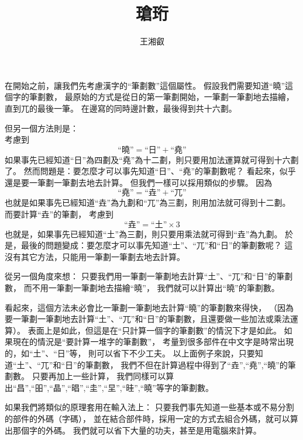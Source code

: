 \documentclass{article}
\title{瑲珩}
\author{王湘叡}
\begin{document}
\maketitle{}

在開始之前，讓我們先考慮漢字的``筆劃數''這個屬性。%
假設我們需要知道``曉''這個字的筆劃數，%
最原始的方式是從日的第一筆劃開始，一筆劃一筆劃地去描繪，直到兀的最後一筆。%
在邊寫的同時邊計數，最後得到共十六劃。%

但另一個方法則是：\\
考慮到\\
\[
  \mbox{``曉''}=\mbox{``日''}+\mbox{``堯''}
\]
如果事先已經知道``日''為四劃及``堯''為十二劃，則只要用加法運算就可得到十六劃了。%
然而問題是：要怎麼才可以事先知道``日''、``堯''的筆劃數呢？%
看起來，似乎還是要一筆劃一筆劃去地去計算。
但我們一樣可以採用類似的步驟。
因為\\
\[
  \mbox{``堯''}=\mbox{``垚''}+\mbox{``兀''}
\]
也就是如果事先已經知道``垚''為九劃和``兀''為三劃，則用加法就可得到十二劃。
而要計算``垚''的筆劃，
考慮到\\
\[
  \mbox{``垚''}=\mbox{``土''}\times 3
\]
也就是，如果事先已經知道``土''為三劃，則只要用乘法就可得到``垚''為九劃。
於是，最後的問題變成：要怎麼才可以事先知道``土''、``兀''和``日''的筆劃數呢？
這沒有其它方法，只能用一筆劃一筆劃去地去計算。

從另一個角度來想：
只要我們用一筆劃一筆劃地去計算``土''、``兀''和``日''的筆劃數，
而不用一筆劃一筆劃地去描繪``曉''，
我們就可以計算出``曉''的筆劃數。

看起來，這個方法未必會比一筆劃一筆劃地去計算``曉''的筆劃數來得快，
（因為要一筆劃一筆劃地去計算``土''、``兀''和``日''的筆劃數，且還要做一些加法或乘法運算）。
表面上是如此，但這是在``只計算一個字的筆劃數''的情況下才是如此。
如果現在的情況是``要計算一堆字的筆劃數''，
考量到很多部件在中文字是時常出現的，如``土''、``日''等，
則可以省下不少工夫。
以上面例子來說，只要知道``土''、``兀''和``日''的筆劃數，
我們不但在計算過程中得到了``垚'',``堯'',``曉''的筆劃數。
只要再加上一些計算，
我們同樣可以算出``昌'',``昍'',``晶'',``晿'',``圭'',``圼'',``晆'',``曉''等字的筆劃數。


如果我們將類似的原理套用在輸入法上：
只要我們事先知道一些基本或不易分割的部件的外碼（字碼），
並在結合部件時，採用一定的方式去組合外碼，就可以算出那個字的外碼。
我們就可以省下大量的功夫，甚至是用電腦來計算。
\end{document}

